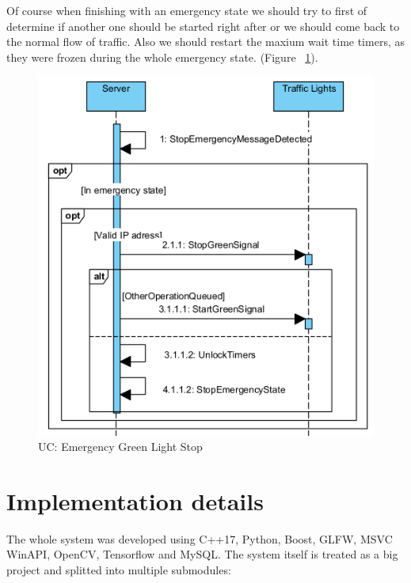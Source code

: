 \documentclass[17pt]{article}
\begin{document}
\indent \indent 
Of course when finishing with an emergency state we should
try to first of determine if another one should be started right
after or we should come back to the normal flow of traffic. Also
we should restart the maxium wait time timers, as they were frozen 
during the whole emergency state. (Figure ~\ref{fig:UC_EmergencyGreenLightStop}).
\begin{figure}[h!]
    \includegraphics[width=\textwidth]{UC/EmergencyStop.png}
    \caption{UC: Emergency Green Light Stop}
    \label{fig:UC_EmergencyGreenLightStop}
\end{figure}
\pagebreak

\pagebreak



\section{Implementation details}
\indent \indent
The whole system was developed using C++17, Python, Boost, GLFW, MSVC WinAPI, OpenCV,
Tensorflow  and MySQL. The system itself is treated as a big project 
and splitted into multiple submodules: 
\end{document}
